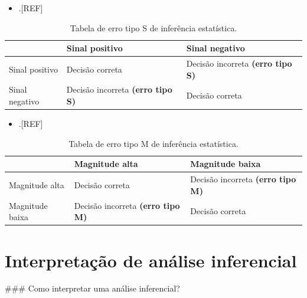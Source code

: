 \documentclass[
  a4paper,
]{book}
\providecommand{\tightlist}{%
  \setlength{\itemsep}{0pt}\setlength{\parskip}{0pt}}
\begin{document}
\begin{itemize}
\tightlist
\item
  .{[}REF{]}
\end{itemize}

\begin{table}

\caption{\label{tab:erros-inferencia-S}Tabela de erro tipo S de inferência estatística.}
\centering
\begin{tabu} to 
\toprule
\textbf{ } & \textbf{Sinal positivo} & \textbf{Sinal negativo}\\
\midrule
Sinal positivo & Decisão correta & Decisão incorreta 
\textbf{ (erro tipo S)}\\
Sinal negativo & Decisão incorreta 
\textbf{ (erro tipo S)} & Decisão correta\\
\bottomrule
\end{tabu}
\end{table}

\begin{itemize}
\tightlist
\item
  .{[}REF{]}
\end{itemize}

\begin{table}

\caption{\label{tab:erros-inferencia-M}Tabela de erro tipo M de inferência estatística.}
\centering
\begin{tabu} to 
\toprule
\textbf{ } & \textbf{Magnitude alta} & \textbf{Magnitude baixa}\\
\midrule
Magnitude alta & Decisão correta & Decisão incorreta 
\textbf{ (erro tipo M)}\\
Magnitude baixa & Decisão incorreta 
\textbf{ (erro tipo M)} & Decisão correta\\
\bottomrule
\end{tabu}
\end{table}

\hypertarget{interpretauxe7uxe3o-de-anuxe1lise-inferencial}{%
\section{Interpretação de análise inferencial}\label{interpretauxe7uxe3o-de-anuxe1lise-inferencial}}

\#\#\# Como interpretar uma análise inferencial?
\end{document}
